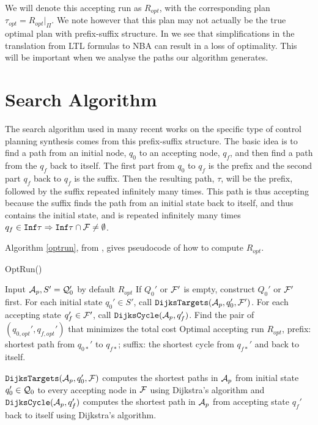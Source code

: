 We will denote this accepting run as $R_{opt}$, with the corresponding plan $\tau_{opt} = R_{opt}|_\Pi$. We note however that this plan may not actually be the true optimal plan with prefix-suffix structure. In \cite{schuppan05} we see that simplifications in the translation from LTL formulas to NBA can result in a loss of optimality. This will be important when we analyse the paths our algorithm generates. 

\section{Search Algorithm}
The search algorithm used in many recent works on the specific type of control planning synthesis comes from this prefix-suffix structure. The basic idea is to find a path from an initial node, $q_0$ to an accepting node, $q_f$, and then find a path from the $q_f$ back to itself. The first part from $q_0$ to $q_f$ is the prefix and the second part $q_f$ back to $q_f$ is the suffix. Then the resulting path, $\tau$, will be the prefix, followed by the suffix repeated infinitely many times. This path is thus accepting because the suffix finds the path from an initial state back to itself, and thus contains the initial state, and is repeated infinitely many times $q_f \in \texttt{Inf} \tau  \Rightarrow \texttt{Inf} \tau \cap \mathcal{F} \neq \emptyset$. 

Algorithm \ref{optrun}, from \cite{guo15}, gives pseudocode of how to compute $R_{opt}$.
\begin{algorithm}
\caption{OptRun()}\label{optrun}
\begin{algorithmic}[1]
\Require Input $\mathcal{A}_p, S' = \mathcal{Q}_0'$ by default
\Ensure $R_{opt}$
\State If $Q_0'$ or $\mathcal{F}'$ is empty, construct $Q_0'$ or $\mathcal{F}'$ first.
\State For each initial state $q_0' \in S'$, call $\texttt{DijksTargets}(\mathcal{A}_p,q_0',\mathcal{F}')$.
\State For each accepting state $q_f' \in \mathcal{F}'$, call $\texttt{DijksCycle}(\mathcal{A}_p,q_f')$. 
\State Find the pair of $(q_{0,opt}',q_{f,opt}')$ that minimizes the total cost
\State Optimal accepting run $R_{opt}$, prefix: shortest path from $q_{0*}'$ to  $q_{f*}$; suffix: the shortest cycle from $q_{f*}'$ and back to itself.
\end{algorithmic}
\end{algorithm}

$\texttt{DijksTargets}(\mathcal{A}_p,q_0',\mathcal{F})$ computes the shortest paths in $\mathcal{A}_p$ from initial state $q_0' \in \mathcal{Q}_0$ to every accepting node in $\mathcal{F}$ using Dijkstra's algorithm \cite{dijkstra59} and $\texttt{DijksCycle}(\mathcal{A}_p,q_f')$ computes the shortest path in $\mathcal{A}_p$ from accepting state $q_f'$ back to itself using Dijkstra's algorithm.

